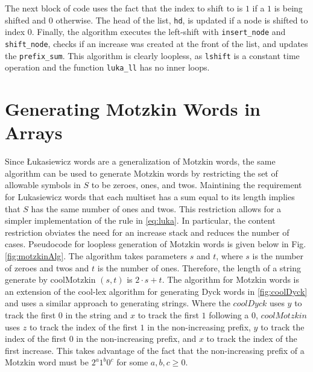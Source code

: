 The next block of code uses the fact that the index to shift to is $1$ if a $1$ is being shifted and $0$ otherwise.  The head of the list, \verb$hd$, is updated if a node is shifted to index 0.  Finally, the algorithm executes the left-shift with \verb$insert_node$ and \verb$shift_node$, checks if an increase was created at the front of the list, and updates the \verb$prefix_sum$.  This algorithm is clearly loopless, as \verb$lshift$ is a constant time operation and the function \verb$luka_ll$ has no inner loops.

\section{Generating Motzkin Words in Arrays}\label{sec:coolMotz}
Since Łukasiewicz words are a generalization of Motzkin words, the same algorithm can be used to generate Motzkin words by restricting the set of allowable symbols in $S$ to be zeroes, ones, and twos. Maintining the requirement for Lukasiewicz words that each multiset has a sum equal to its length implies that $S$ has the same number of ones and twos.  This restriction allows for a simpler implementation of the rule in \eqref{eq:luka}.  In particular, the content restriction obviates the need for an increase stack and reduces the number of cases.   Pseudocode for loopless generation of Motzkin words is given below in Fig. \ref{fig:motzkinAlg}.
The algorithm takes parameters $s$ and $t$, where $s$ is the number of zeroes and twos and $t$ is the number of ones.  Therefore, the length of a string generate by coolMotzkin $(s,t)$ is $2\cdot s + t$.
The algorithm for Motzkin words is an extension of the cool-lex algorithm for generating Dyck words in \ref{fig:coolDyck} and uses a similar approach to generating strings.
Where the $coolDyck$ uses $y$ to track the first $0$ in the string and $x$ to track the first $1$ following a $0$, $coolMotzkin$ uses $z$ to track the index of the first $1$ in the non-increasing prefix, $y$ to track the index of the first $0$ in the non-increasing prefix, and $x$ to track the index of the first increase.  This takes advantage of the fact that the non-increasing prefix of a Motzkin word must be $2^a1^b0^c$ for some $a,b,c \ge 0$.


